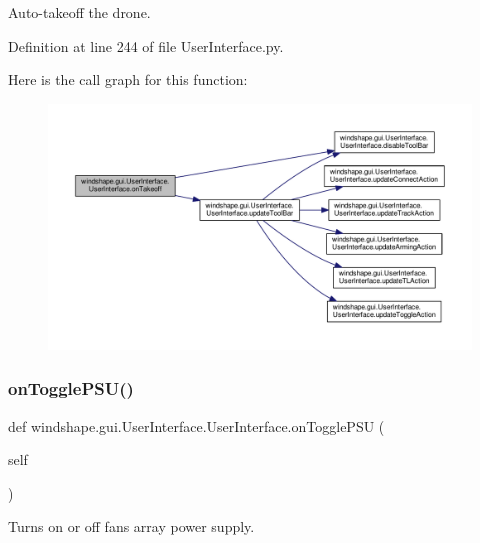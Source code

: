 \begin{DoxyVerb}Auto-takeoff the drone.\end{DoxyVerb}
 

Definition at line 244 of file User\+Interface.\+py.

Here is the call graph for this function\+:\nopagebreak
\begin{figure}[H]
\begin{center}
\leavevmode
\includegraphics[width=350pt]{classwindshape_1_1gui_1_1_user_interface_1_1_user_interface_a470abbe9bce9b3102124b68e11b46e99_cgraph}
\end{center}
\end{figure}
\mbox{\label{classwindshape_1_1gui_1_1_user_interface_1_1_user_interface_a7267a6cc282b9cc69588fdf9d4efb803}} 
\subsubsection{\texorpdfstring{on\+Toggle\+P\+S\+U()}{onTogglePSU()}}
{\footnotesize\ttfamily def windshape.\+gui.\+User\+Interface.\+User\+Interface.\+on\+Toggle\+P\+SU (\begin{DoxyParamCaption}\item[{}]{self }\end{DoxyParamCaption})}

\begin{DoxyVerb}Turns on or off fans array power supply.\end{DoxyVerb}
 

